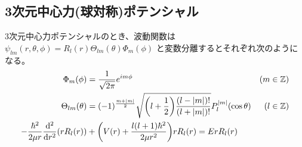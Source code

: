 \documentclass[uplatex,dvipdfmx,a4paper,11pt]{jlreq}
\newcommand{\ZZ}{\mathbb{Z}}
\theoremstyle{definition}
\begin{document}
\subsection{3次元中心力(球対称)ポテンシャル}
\begin{proposition}
  3次元中心力ポテンシャルのとき、波動関数は $\psi_{lm}(r, \theta, \phi) = R_l(r)\Theta_{lm}(\theta)\Phi_m(\phi)$ と変数分離するとそれぞれ次のようになる。
  \begin{align}
    \Phi_m(\phi)                               & = \frac{1}{\sqrt{2\pi}}e^{im\phi}                                                                        & (m\in\ZZ) \\
    \Theta_{lm}(\theta)                        & = (-1)^{\frac{m + |m|}{2}}\sqrt{\qty(l + \frac{1}{2})\frac{(l - |m|)!}{(l + |m|)!}}P_l^{|m|}(\cos\theta) & (l\in\ZZ) \\
    - \frac{\hbar^2}{2\mu r}\dv[2]{r}(rR_l(r)) & + \qty(V(r) + \frac{l(l+1)\hbar^2}{2\mu r^2})rR_l(r) = ErR_l(r)
  \end{align}
\end{proposition}
\end{document}
